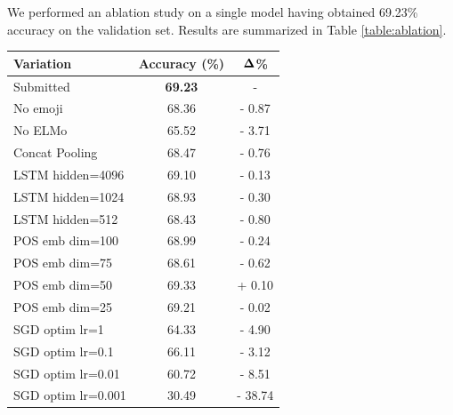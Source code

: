 \documentclass[11pt,a4paper]{article}
\begin{document}
We performed an ablation study on a single model having obtained 69.23\%
accuracy on the validation set. Results are summarized in Table
\ref{table:ablation}.

\begin{table}[!h]
    \centering
    \footnotesize

    \begin{tabular}{lcc}

        \toprule
        \textbf{Variation} & \textbf{Accuracy (\%)} & $\bf{\Delta}$\textbf{\%} \\
        \midrule[0.08em]
        Submitted          & \textbf{69.23}         & -                        \\
        \midrule[0.05em]
        No emoji           & 68.36                  & - 0.87                   \\
        \midrule[0.05em]
        No ELMo            & 65.52                  & - 3.71                   \\
        \midrule[0.05em]
        Concat Pooling     & 68.47                  & - 0.76                   \\
        \midrule[0.05em]
        LSTM hidden=4096   & 69.10                  & - 0.13                   \\
        LSTM hidden=1024   & 68.93                  & - 0.30                   \\
        LSTM hidden=512    & 68.43                  & - 0.80                   \\
        \midrule[0.05em]
        POS emb dim=100    & 68.99                  & - 0.24                   \\
        POS emb dim=75     & 68.61                  & - 0.62                   \\
        POS emb dim=50     & 69.33                  & + 0.10                   \\
        POS emb dim=25     & 69.21                  & - 0.02                   \\
        \midrule[0.05em]
        SGD optim lr=1     & 64.33                  & - 4.90                   \\
        SGD optim lr=0.1   & 66.11                  & - 3.12                   \\
        SGD optim lr=0.01  & 60.72                  & - 8.51                   \\
        SGD optim lr=0.001 & 30.49                  & - 38.74                  \\
        \bottomrule


\end{tabular}
\end{table}
\end{document}
